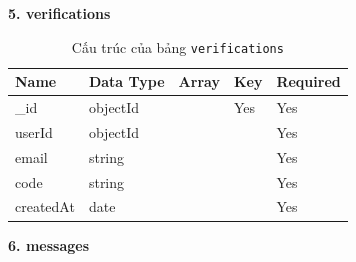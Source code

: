 \newpage
\textbf{5. verifications}

\begin{table}[H]
\centering
\renewcommand{\arraystretch}{1.3}
\begin{tabular}{|p{4cm}|p{4cm}|p{2cm}|p{2cm}|p{2cm}|}
\hline
\textbf{Name} & \textbf{Data Type} & \textbf{Array} & \textbf{Key} & \textbf{Required} \\
\hline
\_id         & objectId &  & Yes & Yes \\
userId       & objectId &  &     & Yes \\
email        & string   &  &     & Yes \\
code         & string   &  &     & Yes \\
createdAt    & date     &  &     & Yes \\
\hline
\end{tabular}
\caption{Cấu trúc của bảng \texttt{verifications}}
\end{table}

\newpage
\textbf{6. messages}

